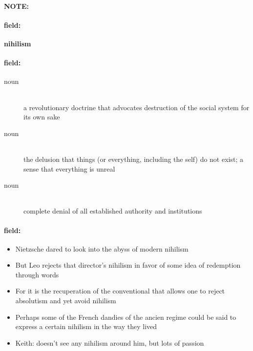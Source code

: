 \documentclass[12pt]{article}
\newenvironment{note}{\paragraph{NOTE:}}{}
\newenvironment{field}{\paragraph{field:}}{}
\begin{document}
\begin{note}
\begin{field}
\textbf{\large nihilism}
\end{field}


\begin{field}
\begin{description}
\item[noun] \hfill \\ 
a revolutionary doctrine that advocates destruction of the social system for its own sake

\item[noun] \hfill \\ 
the delusion that things (or everything, including the self) do not exist; a sense that everything is unreal

\item[noun] \hfill \\ 
complete denial of all established authority and institutions

\end{description}
\end{field}

\begin{field}
\begin{itemize}
\item Nietzsche dared to look into the abyss of modern nihilism
\item But Leo rejects that director's nihilism in favor of some idea of redemption through words
\item For it is the recuperation of the conventional that allows one to reject absolutism and yet avoid nihilism
\item Perhaps some of the French dandies of the ancien regime could be said to express a certain nihilism in the way they lived
\item Keith: doesn't see any nihilism around him, but lots of passion
\end{itemize}
\end{field}
\end{note}
\end{document}
